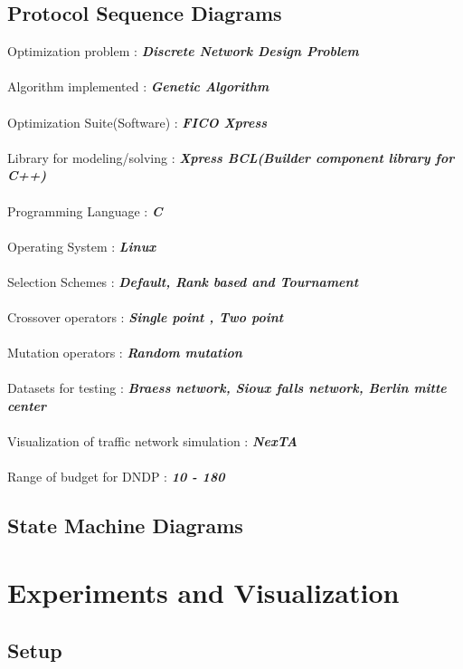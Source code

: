 \documentclass[a4paper, 12pt]{article}
\begin{document}
\subsection{Protocol Sequence Diagrams}
\vspace{15mm}
Optimization problem :     \textbf{\textit{Discrete Network Design Problem}}\\~\\
Algorithm implemented :    \textbf{\textit{Genetic Algorithm}}\\~\\
Optimization Suite(Software) : \textbf{\textit{FICO Xpress}}\\~\\
Library for modeling/solving : \textbf{\textit{Xpress BCL(Builder component library for C++)}}\\~\\
Programming Language : \textbf{\textit{C}}\\~\\
Operating System : \textbf{\textit{Linux}}\\~\\
Selection Schemes : \textbf{\textit{Default, Rank based and Tournament}}\\~\\
Crossover operators : \textbf{\textit{Single point , Two point}}\\~\\
Mutation operators : \textbf{\textit{Random mutation}}\\~\\
Datasets for testing : \textbf{\textit{Braess network, Sioux falls network, Berlin mitte center}}\\~\\
Visualization of traffic network simulation : \textbf{\textit{NexTA}}\\~\\
Range of budget for DNDP : \textbf{\textit{10 - 180}}\\
\clearpage
\subsection{State Machine Diagrams}
\clearpage
\section{Experiments and Visualization}
\subsection{Setup}
\end{document}
